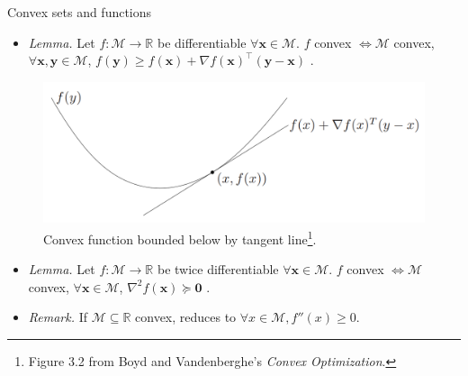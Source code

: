 \documentclass{beamer}
\numberwithin{equation}{section}
\begin{document}
\begin{frame}{Convex sets and functions}
    \begin{itemize}
        \item
        \textit{Lemma.} Let $ f : \mathcal{M} \rightarrow \mathbb{R} $ be
        differentiable $ \forall \mathbf{x} \in \mathcal{M} $. $ f $
        convex $ \Leftrightarrow \mathcal{M} $ convex, $ \forall \mathbf{x},
        \mathbf{y} \in \mathcal{M} $, $ f(\mathbf{y}) \ge f(\mathbf{x}) +
        \nabla f(\mathbf{x})^\top(\mathbf{y} - \mathbf{x}) $
        \cite{bv_convex_opt}.
    \end{itemize}
    \begin{figure}
        \centering
        \vspace{-5 pt}
        \includegraphics[scale = 0.3]{bv_fig_3.2.png}
        \vspace{-10 pt}
        \caption{Convex function bounded below by tangent line\footnote{
            Figure 3.2 from Boyd and Vandenberghe's
            \textit{Convex Optimization}.
        }. }
        \vspace{-15 pt}
    \end{figure}
    \begin{itemize}
        \item
        \textit{Lemma.} Let $ f : \mathcal{M} \rightarrow \mathbb{R} $ be
        twice differentiable $ \forall \mathbf{x} \in \mathcal{M} $.
        $ f $ convex $ \Leftrightarrow \mathcal{M} $ convex, $ \forall
        \mathbf{x} \in \mathcal{M} $, $ \nabla^2f(\mathbf{x}) \succeq
        \mathbf{0} $ \cite{bv_convex_opt}.

        \item
        \textit{Remark.} If $ \mathcal{M} \subseteq \mathbb{R} $ convex,
        reduces to $ \forall x \in \mathcal{M}, f''(x) \ge 0 $.
    \end{itemize}

    \medskip

\end{frame}
\end{document}

